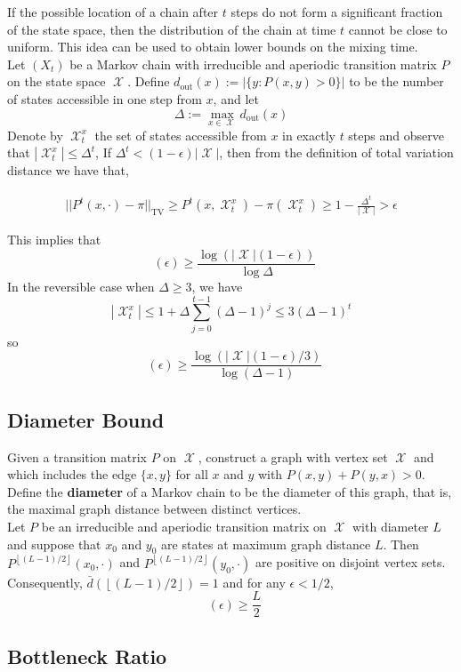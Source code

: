 \documentclass[12pt]{article}
\newcommand{\floor}[1]{\left\lfloor #1 \right\rfloor}
\DeclareMathOperator*{\TV}{\text{TV}}
\DeclareMathOperator*{\mix}{t_{\text{mix}}}
\DeclareMathOperator*{\X}{\mathcal{X}}
\begin{document}
If the possible location of a chain after $t$ steps do not form a significant fraction of the state space, then the distribution of the chain at time $t$ cannot be close to uniform. This idea can be used to obtain lower bounds on the mixing time.\\

Let $(X_t)$ be a Markov chain with irreducible and aperiodic transition matrix $P$ on the state space $\X$. Define $d_{\text{out}}(x) := |\{y: P(x,y) > 0\}|$ to be the number of states accessible in one step from $x$, and let $$\Delta := \max_{x \in \X} d_{\text{out}}(x)$$ Denote by $\X_t^x$ the set of states accessible from $x$ in exactly $t$ steps and observe that $|\X^x_t|\leq \Delta^t$, If $\Delta^t < (1 - \epsilon)|\X|$, then from the definition of total variation distance we have that,

\begin{align*}
||P^t(x, \cdot) - \pi||_{\TV} \geq P^t(x, \X^x_t) - \pi(\X_t^x) \geq 1 - \frac{\Delta^t}{|\X|} > \epsilon
\end{align*}

This implies that $$\mix(\epsilon) \geq \frac{\log(|\X|(1 - \epsilon))}{\log \Delta}$$ In the reversible case when $\Delta \geq 3$, we have $$|\X_t^x| \leq 1 + \Delta \sum_{j=0}^{t-1} (\Delta - 1)^j \leq 3(\Delta - 1)^t$$ so $$\mix(\epsilon) \geq \frac{\log(|\X| (1 - \epsilon)/3)}{\log (\Delta - 1)}$$

\subsection{Diameter Bound}

Given a transition matrix $P$ on $\X$, construct a graph with vertex set $\X$ and which includes the edge $\{x,y\}$ for all $x$ and $y$ with $P(x,y) + P(y,x) > 0$. Define the \textbf{diameter} of a Markov chain to be the diameter of this graph, that is, the maximal graph distance between distinct vertices.\\

Let $P$ be an irreducible and aperiodic transition matrix on $\X$ with diameter $L$ and suppose that $x_0$ and $y_0$ are states at maximum graph distance $L$. Then $P^{\floor{(L-1)/2}}(x_0, \cdot)$ and $P^{\floor{(L-1)/2}}(y_0, \cdot)$ are positive on disjoint vertex sets. Consequently, $\bar{d}(\floor{(L-1)/2}) = 1$ and for any $\epsilon < 1/2$, $$\mix(\epsilon) \geq \frac{L}{2}$$

\subsection{Bottleneck Ratio}
\end{document}
